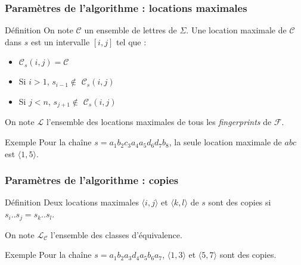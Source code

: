 \documentclass[10pt]{beamer}
\begin{document}
\begin{frame}
	\frametitle{Paramètres de l'algorithme : locations maximales}
	
	\begin{block}{Définition}
		On note $\mathcal{C}$ un ensemble de lettres de $\Sigma$. Une location maximale de $\mathcal{C}$ dans $s$ est un intervalle $[i,j]$ tel que :
		
		\begin{itemize}
			\item $\mathcal{C}_{s}(i,j) = \mathcal{C}$
			\item Si $i > 1$, $s_{i-1} \notin$ $\mathcal{C}_{s}(i,j)$
			\item Si $j < n$, $s_{j+1} \notin$ $\mathcal{C}_{s}(i,j)$
		\end{itemize}
		
		On note $\mathcal{L}$ l'ensemble des locations maximales de tous les \textit{fingerprints} de $\mathcal{F}$.
	\end{block}
	
	\begin{block}{Exemple}
		Pour la chaîne $s = a_{1} b_{2} c_{3} a_{4} a_{5} d_{6} d_{7} b_{8}$, la seule location maximale de $abc$ est $\langle1,5\rangle$.
	\end{block}
\end{frame}

\begin{frame}
	\frametitle{Paramètres de l'algorithme : copies}
	
	\begin{block}{Définition}
		Deux locations maximales $\langle i,j \rangle$ et $\langle k,l \rangle$ de $s$ sont des copies si $s_{i}..s_{j} = s_{k}..s_{l}$.\newline
		
		On note $\mathcal{L}_{\mathcal{C}}$ l'ensemble des classes d'équivalence.
	\end{block}
	
	\begin{block}{Exemple}
		Pour la chaîne $s = a_{1} b_{2} a_{3} d_{4} a_{5} b_{6} a_{7}$, $\langle1,3\rangle$ et $\langle5,7\rangle$ sont des copies.
	\end{block}
\end{frame}
\end{document}
